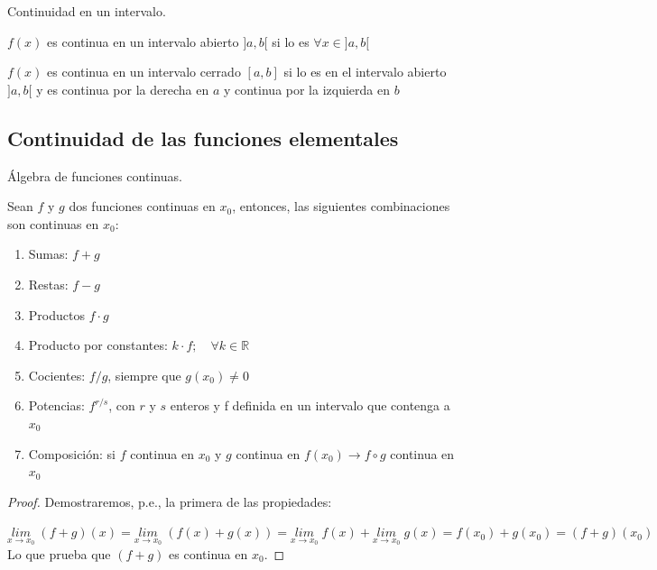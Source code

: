 	\begin{defi}Continuidad en un intervalo.
	
	$f(x)$ es continua en un intervalo abierto $]a,b[$ si lo es $\forall x \in ]a,b[$
	
	$f(x)$ es continua en un intervalo cerrado $[a,b]$ si lo es en el intervalo abierto $]a,b[$ y es continua por la derecha en $a$ y continua por la izquierda en $b$
		
	\end{defi}
	
	\subsection{Continuidad de las funciones elementales}
	
	\begin{teor} Álgebra de funciones continuas.
	
	Sean $f$ y $g$ dos funciones continuas en $x_0$, entonces, las siguientes combinaciones son continuas en $x_0$:
	
	\begin{enumerate}
		\item Sumas: $f+g$
		\item Restas: $f-g$
		\item Productos $f\cdot g$
		\item Producto por constantes: $k\cdot f; \quad \forall k\in \mathbb R$
		\item Cocientes: $f/g$, siempre que $g(x_0)\neq 0$
		\item Potencias: $f^{r/s}$, con $r$ y $s$ enteros y f definida en un intervalo que contenga a $x_0$
		\item Composición: si $f$ continua en $x_0$ y $g$ continua en $f(x_0) \to f\circ g$ continua en $x_0$ 
	\end{enumerate}
		
	\end{teor}

	\begin{proof}
		Demostraremos, p.e., la primera de las propiedades:
		
		$\underset {x\to x_0}{lim}\; {(f+g)(x)}=\underset {x\to x_0}{lim}\; {(f(x)+g(x))}=\underset {x\to x_0}{lim}\; {f(x)}+\underset {x\to x_0}{lim}\; {g(x)} =f(x_0)+g(x_0)=(f+g)(x_0)$ Lo que prueba que $(f+g)$ es continua en $x_0$.
	\end{proof}
	
